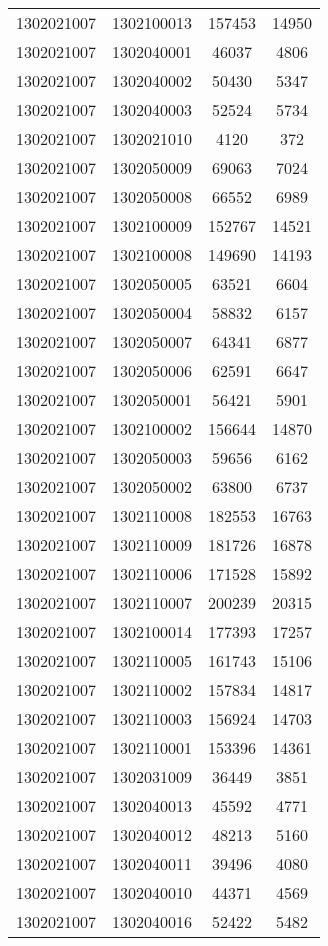 \begin{longtable}[h]{llcc}
		1302021007 & 1302100013 & 157453 & 14950\\
		1302021007 & 1302040001 & 46037 & 4806\\
		1302021007 & 1302040002 & 50430 & 5347\\
		1302021007 & 1302040003 & 52524 & 5734\\
		1302021007 & 1302021010 & 4120 & 372\\
		1302021007 & 1302050009 & 69063 & 7024\\
		1302021007 & 1302050008 & 66552 & 6989\\
		1302021007 & 1302100009 & 152767 & 14521\\
		1302021007 & 1302100008 & 149690 & 14193\\
		1302021007 & 1302050005 & 63521 & 6604\\
		1302021007 & 1302050004 & 58832 & 6157\\
		1302021007 & 1302050007 & 64341 & 6877\\
		1302021007 & 1302050006 & 62591 & 6647\\
		1302021007 & 1302050001 & 56421 & 5901\\
		1302021007 & 1302100002 & 156644 & 14870\\
		1302021007 & 1302050003 & 59656 & 6162\\
		1302021007 & 1302050002 & 63800 & 6737\\
		1302021007 & 1302110008 & 182553 & 16763\\
		1302021007 & 1302110009 & 181726 & 16878\\
		1302021007 & 1302110006 & 171528 & 15892\\
		1302021007 & 1302110007 & 200239 & 20315\\
		1302021007 & 1302100014 & 177393 & 17257\\
		1302021007 & 1302110005 & 161743 & 15106\\
		1302021007 & 1302110002 & 157834 & 14817\\
		1302021007 & 1302110003 & 156924 & 14703\\
		1302021007 & 1302110001 & 153396 & 14361\\
		1302021007 & 1302031009 & 36449 & 3851\\
		1302021007 & 1302040013 & 45592 & 4771\\
		1302021007 & 1302040012 & 48213 & 5160\\
		1302021007 & 1302040011 & 39496 & 4080\\
		1302021007 & 1302040010 & 44371 & 4569\\
		1302021007 & 1302040016 & 52422 & 5482\\

\end{longtable}
